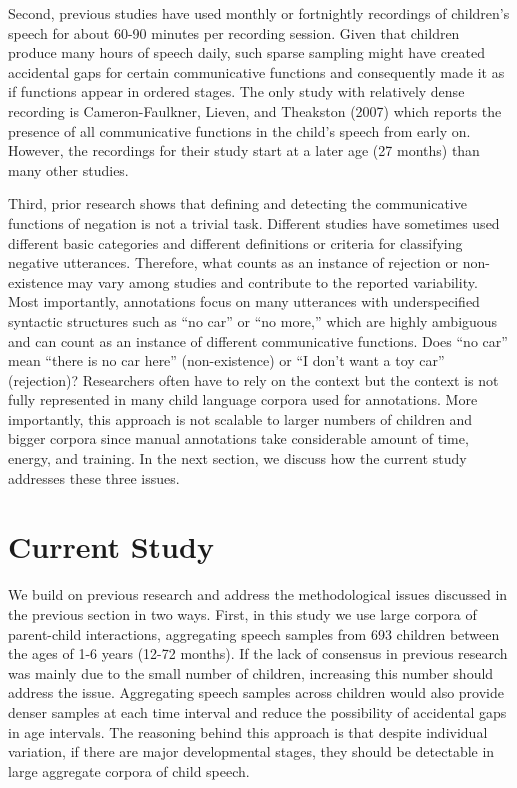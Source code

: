 \documentclass[
  english,
  man,floatsintext]{apa6}
\begin{document}
Second, previous studies have used monthly or fortnightly recordings of children's speech for about 60-90 minutes per recording session. Given that children produce many hours of speech daily, such sparse sampling might have created accidental gaps for certain communicative functions and consequently made it as if functions appear in ordered stages. The only study with relatively dense recording is Cameron-Faulkner, Lieven, and Theakston (2007) which reports the presence of all communicative functions in the child's speech from early on. However, the recordings for their study start at a later age (27 months) than many other studies.

Third, prior research shows that defining and detecting the communicative functions of negation is not a trivial task. Different studies have sometimes used different basic categories and different definitions or criteria for classifying negative utterances. Therefore, what counts as an instance of rejection or non-existence may vary among studies and contribute to the reported variability. Most importantly, annotations focus on many utterances with underspecified syntactic structures such as ``no car'' or ``no more,'' which are highly ambiguous and can count as an instance of different communicative functions. Does ``no car'' mean ``there is no car here'' (non-existence) or ``I don't want a toy car'' (rejection)? Researchers often have to rely on the context but the context is not fully represented in many child language corpora used for annotations. More importantly, this approach is not scalable to larger numbers of children and bigger corpora since manual annotations take considerable amount of time, energy, and training. In the next section, we discuss how the current study addresses these three issues.

\hypertarget{current-study}{%
\section{Current Study}\label{current-study}}

We build on previous research and address the methodological issues discussed in the previous section in two ways. First, in this study we use large corpora of parent-child interactions, aggregating speech samples from 693 children between the ages of 1-6 years (12-72 months). If the lack of consensus in previous research was mainly due to the small number of children, increasing this number should address the issue. Aggregating speech samples across children would also provide denser samples at each time interval and reduce the possibility of accidental gaps in age intervals. The reasoning behind this approach is that despite individual variation, if there are major developmental stages, they should be detectable in large aggregate corpora of child speech.
\end{document}
